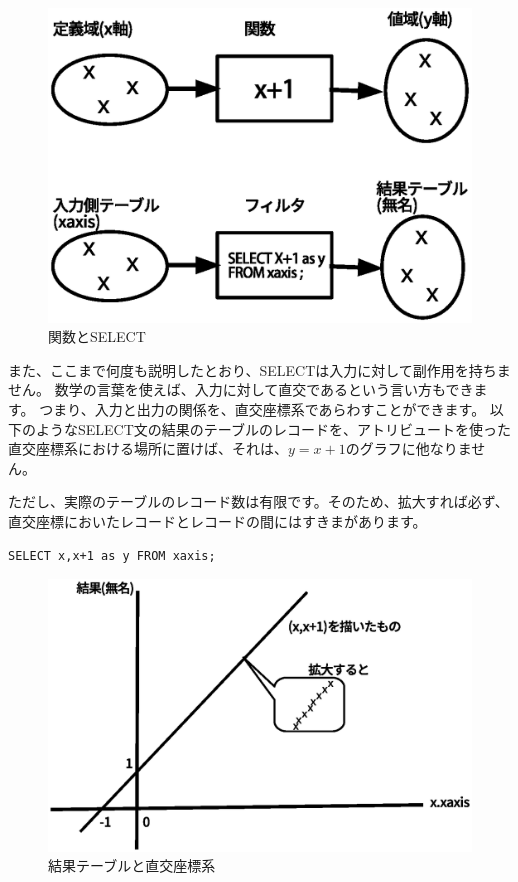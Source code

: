 \begin{figure}[htbp]
	\includegraphics[width=12cm,clip]{draw/function.eps}
	\caption{関数とSELECT}
	\label{fig:function}
\end{figure}

また、ここまで何度も説明したとおり、SELECTは入力に対して副作用を持ちません。
数学の言葉を使えば、入力に対して直交であるという言い方もできます。
つまり、入力と出力の関係を、直交座標系であらわすことができます。
以下のようなSELECT文の結果のテーブルのレコードを、アトリビュートを使った直交座標系における場所に置けば、それは、$y=x+1$のグラフに他なりません。

ただし、実際のテーブルのレコード数は有限です。そのため、拡大すれば必ず、直交座標においたレコードとレコードの間にはすきまがあります。

\begin{verbatim}
SELECT x,x+1 as y FROM xaxis;
\end{verbatim}

\begin{figure}[htbp]
	\includegraphics[width=12cm,clip]{draw/plot.eps}
	\caption{結果テーブルと直交座標系}
	\label{fig:function}
\end{figure}

